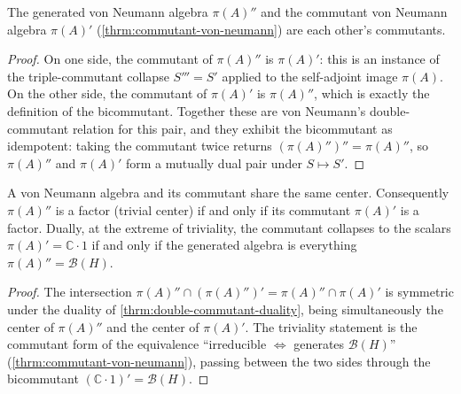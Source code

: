 \begin{theorem}
    \label{thrm:double-commutant-duality}
    \leanok
    The generated von Neumann algebra $\pi(A)''$ and the commutant von Neumann algebra $\pi(A)'$ (\ref{thrm:commutant-von-neumann}) are each other's commutants.
\end{theorem}
\begin{proof}
    \leanok
    On one side, the commutant of $\pi(A)''$ is $\pi(A)'$: this is an instance of the triple-commutant collapse $S''' = S'$ applied to the self-adjoint image $\pi(A)$. On the other side, the commutant of $\pi(A)'$ is $\pi(A)''$, which is exactly the definition of the bicommutant. Together these are von Neumann's double-commutant relation for this pair, and they exhibit the bicommutant as idempotent: taking the commutant twice returns $(\pi(A)'')'' = \pi(A)''$, so $\pi(A)''$ and $\pi(A)'$ form a mutually dual pair under $S \mapsto S'$.
\end{proof}

\begin{theorem}
    \label{thrm:commutant-factor-duality}
    \leanok
    A von Neumann algebra and its commutant share the same center. Consequently $\pi(A)''$ is a factor (trivial center) if and only if its commutant $\pi(A)'$ is a factor. Dually, at the extreme of triviality, the commutant collapses to the scalars $\pi(A)' = \mathbb{C}\cdot 1$ if and only if the generated algebra is everything $\pi(A)'' = \mathcal{B}(H)$.
\end{theorem}
\begin{proof}
    \leanok
    The intersection $\pi(A)'' \cap (\pi(A)'')' = \pi(A)'' \cap \pi(A)'$ is symmetric under the duality of \ref{thrm:double-commutant-duality}, being simultaneously the center of $\pi(A)''$ and the center of $\pi(A)'$. The triviality statement is the commutant form of the equivalence ``irreducible $\iff$ generates $\mathcal{B}(H)$'' (\ref{thrm:commutant-von-neumann}), passing between the two sides through the bicommutant $(\mathbb{C}\cdot 1)' = \mathcal{B}(H)$.
\end{proof}

